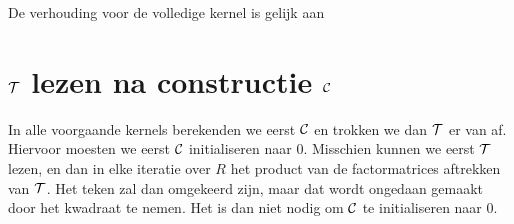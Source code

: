 De verhouding voor de volledige kernel is gelijk aan

\section{$\mathcal{T}$ lezen na constructie $\mathcal{C}$}
In alle voorgaande kernels berekenden we eerst $\mathcal{C}$ en trokken we dan $\mathcal{T}$ er van af. Hiervoor moesten we eerst $\mathcal{C}$ initialiseren naar 0. Misschien kunnen we eerst $\mathcal{T}$ lezen, en dan in elke iteratie over $R$ het product van de factormatrices aftrekken van $\mathcal{T}$. Het teken zal dan omgekeerd zijn, maar dat wordt ongedaan gemaakt door het kwadraat te nemen. Het is dan niet nodig om $\mathcal{C}$ te initialiseren naar 0.

